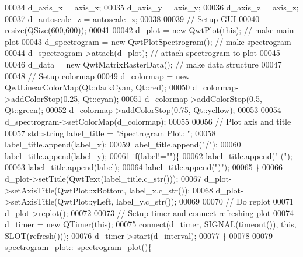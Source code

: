 \begin{DoxyCode}
00034             d_axis_x = axis\_x;
00035             d_axis_y = axis\_y;
00036             d_axis_z = axis\_z;
00037             d_autoscale_z = autoscale\_z;
00038             
00039             \textcolor{comment}{// Setup GUI}
00040             resize(QSize(600,600));
00041             
00042             d_plot = \textcolor{keyword}{new} QwtPlot(\textcolor{keyword}{this}); \textcolor{comment}{// make main plot}
00043             d_spectrogram = \textcolor{keyword}{new} QwtPlotSpectrogram(); \textcolor{comment}{// make spectrogram}
00044             d_spectrogram->attach(d_plot); \textcolor{comment}{// attach spectrogram to plot}
00045             
00046             d_data = \textcolor{keyword}{new} QwtMatrixRasterData(); \textcolor{comment}{// make data structure}
00047             
00048             \textcolor{comment}{// Setup colormap}
00049             d_colormap = \textcolor{keyword}{new} QwtLinearColorMap(Qt::darkCyan, Qt::red);
00050             d_colormap->addColorStop(0.25, Qt::cyan);
00051             d_colormap->addColorStop(0.5, Qt::green);
00052             d_colormap->addColorStop(0.75, Qt::yellow);
00053             
00054             d_spectrogram->setColorMap(d_colormap);
00055             
00056             \textcolor{comment}{// Plot axis and title}
00057             std::string label\_title = \textcolor{stringliteral}{"Spectrogram Plot: "};
00058             label\_title.append(label\_x);
00059             label\_title.append(\textcolor{stringliteral}{"/"});
00060             label\_title.append(label\_y);
00061             \textcolor{keywordflow}{if}(label!=\textcolor{stringliteral}{""})\{
00062                 label\_title.append(\textcolor{stringliteral}{" ("});
00063                 label\_title.append(label);
00064                 label\_title.append(\textcolor{stringliteral}{")"});
00065             \}
00066             d_plot->setTitle(QwtText(label\_title.c\_str())); 
00067             d_plot->setAxisTitle(QwtPlot::xBottom, label\_x.c\_str());
00068             d_plot->setAxisTitle(QwtPlot::yLeft, label\_y.c\_str());
00069             
00070             \textcolor{comment}{// Do replot}
00071             d_plot->replot();
00072             
00073             \textcolor{comment}{// Setup timer and connect refreshing plot}
00074             d_timer = \textcolor{keyword}{new} QTimer(\textcolor{keyword}{this});
00075             connect(d_timer, SIGNAL(timeout()), \textcolor{keyword}{this}, SLOT(refresh()));
00076             d_timer->start(d_interval);
00077         \}
00078 
00079         spectrogram_plot::~spectrogram_plot()\{

\end{DoxyCode}
